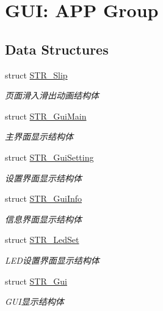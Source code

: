 \hypertarget{group___g_u_i}{\section{\-G\-U\-I\-: \-A\-P\-P \-Group}
\label{group___g_u_i}
}
\subsection*{\-Data \-Structures}
\begin{DoxyCompactItemize}
\item 
struct \hyperlink{struct_s_t_r___slip}{\-S\-T\-R\-\_\-\-Slip}
\begin{DoxyCompactList}\small\item\em 页面滑入滑出动画结构体 \end{DoxyCompactList}\item 
struct \hyperlink{struct_s_t_r___gui_main}{\-S\-T\-R\-\_\-\-Gui\-Main}
\begin{DoxyCompactList}\small\item\em 主界面显示结构体 \end{DoxyCompactList}\item 
struct \hyperlink{struct_s_t_r___gui_setting}{\-S\-T\-R\-\_\-\-Gui\-Setting}
\begin{DoxyCompactList}\small\item\em 设置界面显示结构体 \end{DoxyCompactList}\item 
struct \hyperlink{struct_s_t_r___gui_info}{\-S\-T\-R\-\_\-\-Gui\-Info}
\begin{DoxyCompactList}\small\item\em 信息界面显示结构体 \end{DoxyCompactList}\item 
struct \hyperlink{struct_s_t_r___led_set}{\-S\-T\-R\-\_\-\-Led\-Set}
\begin{DoxyCompactList}\small\item\em \-L\-E\-D设置界面显示结构体 \end{DoxyCompactList}\item 
struct \hyperlink{struct_s_t_r___gui}{\-S\-T\-R\-\_\-\-Gui}
\begin{DoxyCompactList}\small\item\em \-G\-U\-I显示结构体 \end{DoxyCompactList}\end{DoxyCompactItemize}
